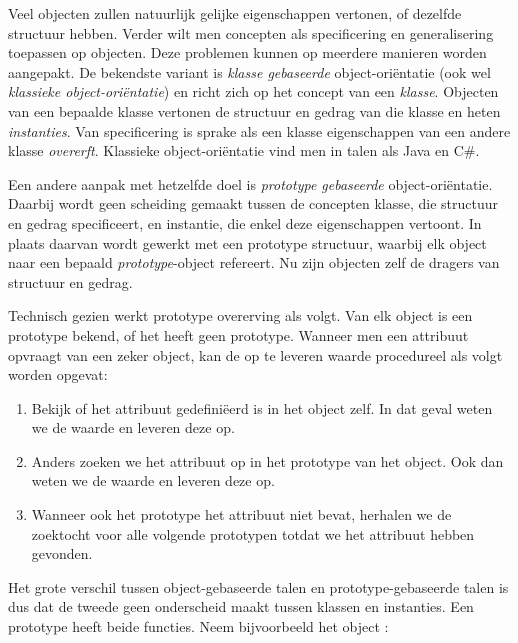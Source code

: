 Veel objecten zullen natuurlijk gelijke eigenschappen vertonen, of dezelfde structuur hebben. Verder wilt men concepten als specificering en generalisering toepassen op objecten. Deze problemen kunnen op meerdere manieren worden aangepakt. De bekendste variant is \emph{klasse gebaseerde} object-oriëntatie (ook wel \emph{klassieke object-oriëntatie}) en richt zich op het concept van een \emph{klasse}. Objecten van een bepaalde klasse vertonen de structuur en gedrag van die klasse en heten \emph{instanties}. Van specificering is sprake als een klasse eigenschappen van een andere klasse \emph{overerft}. Klassieke object-oriëntatie vind men in talen als Java en C\#.

Een andere aanpak met hetzelfde doel is \emph{prototype gebaseerde} object-oriëntatie. Daarbij wordt geen scheiding gemaakt tussen de concepten klasse, die structuur en gedrag specificeert, en instantie, die enkel deze eigenschappen vertoont. In plaats daarvan wordt gewerkt met een prototype structuur, waarbij elk object naar een bepaald \emph{prototype}-object refereert. Nu zijn objecten zelf de dragers van structuur en gedrag.

Technisch gezien werkt prototype overerving als volgt. Van elk object is een prototype bekend, of het heeft geen prototype. Wanneer men een attribuut opvraagt van een zeker object, kan de op te leveren waarde procedureel als volgt worden opgevat:

\begin{enumerate}
  \item Bekijk of het attribuut gedefiniëerd is in het object zelf. In dat geval weten we de waarde en leveren deze op.
  \item Anders zoeken we het attribuut op in het prototype van het object. Ook dan weten we de waarde en leveren deze op.
  \item Wanneer ook het prototype het attribuut niet bevat, herhalen we de zoektocht voor alle volgende prototypen totdat we het attribuut hebben gevonden.
\end{enumerate}

Het grote verschil tussen object-gebaseerde talen en prototype-gebaseerde talen is dus dat de tweede geen onderscheid maakt tussen klassen en instanties. Een prototype heeft beide functies. Neem bijvoorbeeld het object :

\newCodeFragment

